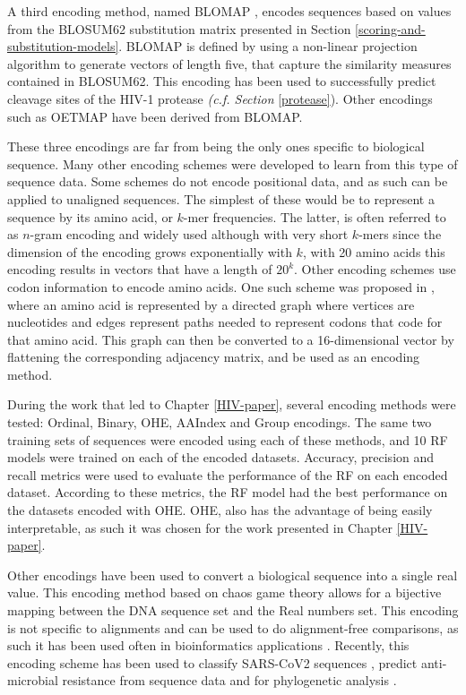 \documentclass[
  11pt,
  twoside,
  BCOR=10mm,
  listof=totoc]{scrbook}
\begin{document}
A third encoding method, named BLOMAP \autocite{maetschkeBlomapEncodingAmino2005}, encodes sequences based on values from the BLOSUM62 substitution matrix presented in Section \ref{scoring-and-substitution-models}. BLOMAP is defined by using a non-linear projection algorithm to generate vectors of length five, that capture the similarity measures contained in BLOSUM62. This encoding has been used to successfully predict cleavage sites of the HIV-1 protease \autocite{maetschkeBlomapEncodingAmino2005,singhEvolutionaryBasedOptimal2018} \emph{(c.f. Section} \ref{protease}). Other encodings such as OETMAP \autocite{gokNewFeatureEncoding2013} have been derived from BLOMAP.

These three encodings are far from being the only ones specific to biological sequence. Many other encoding schemes were developed to learn from this type of sequence data. Some schemes do not encode positional data, and as such can be applied to unaligned sequences. The simplest of these would be to represent a sequence by its amino acid, or \(k\)-mer frequencies. The latter, is often referred to as \(n\)-gram encoding \autocite{sahaNovelApproachFind2019} and widely used although with very short \(k\)-mers since the dimension of the encoding grows exponentially with \(k\), with 20 amino acids this encoding results in vectors that have a length of \(20^k\). Other encoding schemes use codon information to encode amino acids. One such scheme was proposed in \autocite{zamaniAminoAcidEncoding2011}, where an amino acid is represented by a directed graph where vertices are nucleotides and edges represent paths needed to represent codons that code for that amino acid. This graph can then be converted to a 16-dimensional vector by flattening the corresponding adjacency matrix, and be used as an encoding method.

During the work that led to Chapter \ref{HIV-paper}, several encoding methods were tested: Ordinal, Binary, OHE, AAIndex and Group encodings. The same two training sets of sequences were encoded using each of these methods, and 10 RF models were trained on each of the encoded datasets. Accuracy, precision and recall metrics were used to evaluate the performance of the RF on each encoded dataset. According to these metrics, the RF model had the best performance on the datasets encoded with OHE. OHE, also has the advantage of being easily interpretable, as such it was chosen for the work presented in Chapter \ref{HIV-paper}.

Other encodings have been used to convert a biological sequence into a single real value. This encoding method based on chaos game theory \autocite{jeffreyChaosGameRepresentation1990} allows for a bijective mapping between the DNA sequence set and the Real numbers set. This encoding is not specific to alignments and can be used to do alignment-free comparisons, as such it has been used often in bioinformatics applications \autocite{lochelChaosGameRepresentation2021}. Recently, this encoding scheme has been used to classify SARS-CoV2 sequences \autocite{cartesAccurateFastClade2022}, predict anti-microbial resistance from sequence data \autocite{renPredictionAntimicrobialResistance2022} and for phylogenetic analysis \autocite{niApplyingFrequencyChaos2021}.
\end{document}
